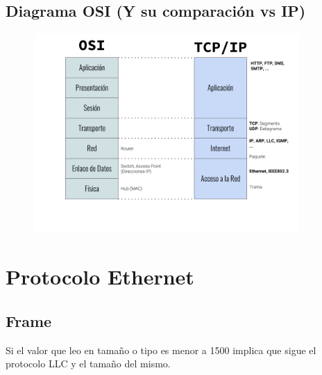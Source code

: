 \documentclass[12pt, fleqn]{report}                             %
\theoremstyle{break}                                            %
\begin{document}
        \section{Diagrama OSI (Y su comparación vs IP)}

            \begin{figure}[h]
                \centering
                \includegraphics[width=0.9\textwidth]{OSI&IP}
            \end{figure}





    \clearpage
    \chapter{Protocolo Ethernet}



        \clearpage
        \section{Frame}

            Si el valor que leo en tamaño o tipo es menor a 1500 implica que sigue el protocolo LLC y el tamaño del mismo.
\end{document}
